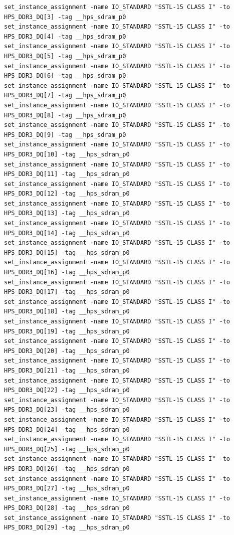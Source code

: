 \documentclass[conference]{IEEEtran}
\begin{document}
\begin{lstlisting}
set_instance_assignment -name IO_STANDARD "SSTL-15 CLASS I" -to HPS_DDR3_DQ[3] -tag __hps_sdram_p0
set_instance_assignment -name IO_STANDARD "SSTL-15 CLASS I" -to HPS_DDR3_DQ[4] -tag __hps_sdram_p0
set_instance_assignment -name IO_STANDARD "SSTL-15 CLASS I" -to HPS_DDR3_DQ[5] -tag __hps_sdram_p0
set_instance_assignment -name IO_STANDARD "SSTL-15 CLASS I" -to HPS_DDR3_DQ[6] -tag __hps_sdram_p0
set_instance_assignment -name IO_STANDARD "SSTL-15 CLASS I" -to HPS_DDR3_DQ[7] -tag __hps_sdram_p0
set_instance_assignment -name IO_STANDARD "SSTL-15 CLASS I" -to HPS_DDR3_DQ[8] -tag __hps_sdram_p0
set_instance_assignment -name IO_STANDARD "SSTL-15 CLASS I" -to HPS_DDR3_DQ[9] -tag __hps_sdram_p0
set_instance_assignment -name IO_STANDARD "SSTL-15 CLASS I" -to HPS_DDR3_DQ[10] -tag __hps_sdram_p0
set_instance_assignment -name IO_STANDARD "SSTL-15 CLASS I" -to HPS_DDR3_DQ[11] -tag __hps_sdram_p0
set_instance_assignment -name IO_STANDARD "SSTL-15 CLASS I" -to HPS_DDR3_DQ[12] -tag __hps_sdram_p0
set_instance_assignment -name IO_STANDARD "SSTL-15 CLASS I" -to HPS_DDR3_DQ[13] -tag __hps_sdram_p0
set_instance_assignment -name IO_STANDARD "SSTL-15 CLASS I" -to HPS_DDR3_DQ[14] -tag __hps_sdram_p0
set_instance_assignment -name IO_STANDARD "SSTL-15 CLASS I" -to HPS_DDR3_DQ[15] -tag __hps_sdram_p0
set_instance_assignment -name IO_STANDARD "SSTL-15 CLASS I" -to HPS_DDR3_DQ[16] -tag __hps_sdram_p0
set_instance_assignment -name IO_STANDARD "SSTL-15 CLASS I" -to HPS_DDR3_DQ[17] -tag __hps_sdram_p0
set_instance_assignment -name IO_STANDARD "SSTL-15 CLASS I" -to HPS_DDR3_DQ[18] -tag __hps_sdram_p0
set_instance_assignment -name IO_STANDARD "SSTL-15 CLASS I" -to HPS_DDR3_DQ[19] -tag __hps_sdram_p0
set_instance_assignment -name IO_STANDARD "SSTL-15 CLASS I" -to HPS_DDR3_DQ[20] -tag __hps_sdram_p0
set_instance_assignment -name IO_STANDARD "SSTL-15 CLASS I" -to HPS_DDR3_DQ[21] -tag __hps_sdram_p0
set_instance_assignment -name IO_STANDARD "SSTL-15 CLASS I" -to HPS_DDR3_DQ[22] -tag __hps_sdram_p0
set_instance_assignment -name IO_STANDARD "SSTL-15 CLASS I" -to HPS_DDR3_DQ[23] -tag __hps_sdram_p0
set_instance_assignment -name IO_STANDARD "SSTL-15 CLASS I" -to HPS_DDR3_DQ[24] -tag __hps_sdram_p0
set_instance_assignment -name IO_STANDARD "SSTL-15 CLASS I" -to HPS_DDR3_DQ[25] -tag __hps_sdram_p0
set_instance_assignment -name IO_STANDARD "SSTL-15 CLASS I" -to HPS_DDR3_DQ[26] -tag __hps_sdram_p0
set_instance_assignment -name IO_STANDARD "SSTL-15 CLASS I" -to HPS_DDR3_DQ[27] -tag __hps_sdram_p0
set_instance_assignment -name IO_STANDARD "SSTL-15 CLASS I" -to HPS_DDR3_DQ[28] -tag __hps_sdram_p0
set_instance_assignment -name IO_STANDARD "SSTL-15 CLASS I" -to HPS_DDR3_DQ[29] -tag __hps_sdram_p0

\end{lstlisting}
\end{document}
